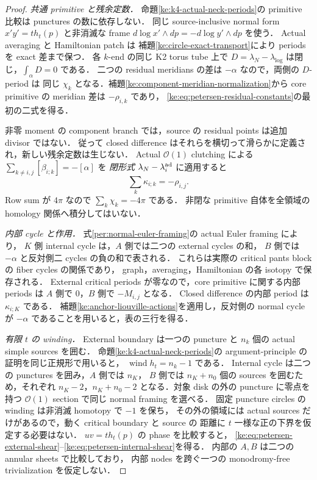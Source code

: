 \begin{proof}
\emph{共通 primitive と残余定数．}
命題\ref{ke:k4-actual-neck-periods}の primitive 比較は punctures の数に依存しない．
同じ source-inclusive normal form $x'y'=t h_t(p)$ と非消滅な frame
$d\log x'\wedge dp=-d\log y'\wedge dp$ を使う．
Actual averaging と Hamiltonian patch は
補題\ref{ke:circle-exact-transport}により periods を exact 差まで保つ．
各 $k$-end の同じ K2 torus tube 上で
$D=\lambda_N-\lambda_{\log}$ は閉じ，$\int_\alpha D=0$ である．
二つの residual meridians の差は $-\alpha$ なので，両側の $D$-period は
同じ $\chi_k$ となる．補題\ref{ke:component-meridian-normalization}から
core primitive の meridian 差は $-\rho_{i,k}$ であり，
\eqref{ke:eq:petersen-residual-constants}の最初の二式を得る．

非零 moment の component branch では，source の residual points は追加 divisor ではない．
従って closed difference はそれらを横切って滑らかに定義され，新しい残余定数は生じない．
Actual $\mathcal O(1)$ clutching による
$\sum_{k\ne i,j}[\beta_{i;k}]=-[\alpha]$ を
\emph{閉形式} $\lambda_N-\lambda_i^{\rm ad}$ に適用すると
\[
 \sum_k\kappa_{i;k}=-\rho_{i,j}.
\]
Row sum が $4\pi$ なので $\sum_k\chi_k=-4\pi$ である．
非閉な primitive 自体を全領域の homology 関係へ積分してはいない．

\emph{内部 cycle と作用．}
式\eqref{per:normal-euler-framing}の actual Euler framing により，
$K$ 側 internal cycle は，$A$ 側では二つの external cycles の和，
$B$ 側では $-\alpha$ と反対側二 cycles の負の和で表される．
これらは実際の critical pants block の fiber cycles の関係であり，
graph，averaging，Hamiltonian の各 isotopy で保存される．
External critical periods が零なので，core primitive に関する内部 periods は
$A$ 側で $0$，$B$ 側で $-M_{i,j}$ となる．
Closed difference の内部 period は $\kappa_{i;K}$ である．
補題\ref{ke:anchor-liouville-actions}を適用し，反対側の normal cycle が
$-\alpha$ であることを用いると，表の三行を得る．

\emph{有限 $t$ の winding．}
External boundary は一つの puncture と $n_k$ 個の actual simple sources を囲む．
命題\ref{ke:k4-actual-neck-periods}の argument-principle の証明を同じ正規形で用いると，
$\operatorname{wind}h_t=n_k-1$ である．
Internal cycle は二つの punctures を囲み，$A$ 側では $n_K$，
$B$ 側では $n_K+n_0$ 個の sources を囲むため，それぞれ
$n_K-2$，$n_K+n_0-2$ となる．対象 disk の外の puncture に零点を持つ
$\mathcal O(1)$ section で同じ normal framing を選べる．
固定 puncture circles の winding は非消滅 homotopy で $-1$ を保ち，
その外の領域には actual sources だけがあるので，動く critical boundary と source の
距離に $t$ 一様な正の下界を仮定する必要はない．
$uv=t h_t(p)$ の phase を比較すると，
\eqref{ke:eq:petersen-external-shear}--\eqref{ke:eq:petersen-internal-shear}を得る．
内部の $A,B$ は二つの annular sheets で比較しており，
内部 nodes を跨ぐ一つの monodromy-free trivialization を仮定しない．


\end{proof}

